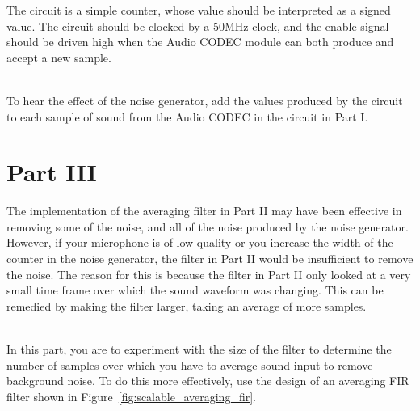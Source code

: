 \documentclass[epsfig,10pt,fullpage]{article}
\begin{document}
The circuit is a simple counter, whose value should be interpreted as a signed value. The circuit should be clocked by a 50MHz clock, and the enable signal
should be driven high when the {\sf Audio CODEC} module can both produce and accept a new sample.

~\\
To hear the effect of the noise generator, add the values produced by the circuit to each sample of sound from the {\sf Audio CODEC} in the circuit in Part I.

\section*{Part III}
The implementation of the averaging filter in Part II may have been effective in removing some of the noise, and all of the noise produced by the noise generator.
However, if your microphone is of low-quality or you increase the width of the counter in the noise generator, the filter in Part II would be insufficient
to remove the noise. The reason for this is because the filter in Part II only looked at a very small time frame over which the sound waveform was
changing. This can be remedied by making the filter larger, taking an average of more samples.

~\\
In this part, you are to experiment with the size of the filter to determine the number of samples over which you have to average sound input to remove
background noise. To do this more effectively, use the design of an averaging FIR filter shown in Figure~\ref{fig:scalable_averaging_fir}.
\end{document}
